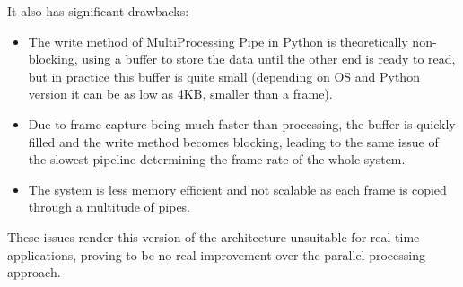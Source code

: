 \documentclass[conference]{IEEEtran}
\begin{document}
It also has significant drawbacks:
\begin{itemize}
    \item The write method of MultiProcessing Pipe in Python is theoretically non-blocking, using a buffer to store the data until the other end is ready to read, but in practice this buffer is quite small (depending on OS and Python version it can be as low as 4KB, smaller than a frame).
    \item Due to frame capture being much faster than processing, the buffer is quickly filled and the write method becomes blocking, leading to the same issue of the slowest pipeline determining the frame rate of the whole system.
    \item The system is less memory efficient and not scalable as each frame is copied through a multitude of pipes.
\end{itemize}

These issues render this version of the architecture unsuitable for real-time applications, proving to be no real improvement over the parallel processing approach.

%
\end{document}
